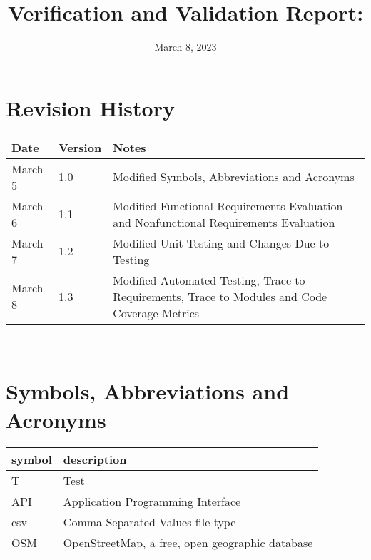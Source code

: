 \documentclass[12pt, titlepage]{article}
\begin{document}
\title{Verification and Validation Report: \progname} 
\author{\authname}
\date{March 8, 2023}
	
\maketitle


\section{Revision History}

\begin{tabularx}{\textwidth}{p{3cm}p{2cm}X}
\toprule {\bf Date} & {\bf Version} & {\bf Notes}\\
\midrule
March 5 & 1.0 & Modified Symbols, Abbreviations and Acronyms\\
March 6 & 1.1 & Modified Functional Requirements Evaluation and Nonfunctional Requirements Evaluation\\
March 7 & 1.2 & Modified Unit Testing and Changes Due to Testing\\
March 8 & 1.3 & Modified Automated Testing, Trace to Requirements, Trace to Modules and Code Coverage Metrics\\
\bottomrule
\end{tabularx}

~\newpage

\section{Symbols, Abbreviations and Acronyms}

\renewcommand{\arraystretch}{1.2}
\begin{tabular}{l l} 
  \toprule		
  \textbf{symbol} & \textbf{description}\\
  \midrule 
  T & Test\\
  API & Application Programming Interface\\
  csv & Comma Separated Values file type\\
  OSM & OpenStreetMap, a free, open geographic database\\
  \bottomrule
\end{tabular}\\

\newpage

\tableofcontents

\listoftables %

\listoffigures %
\end{document}
